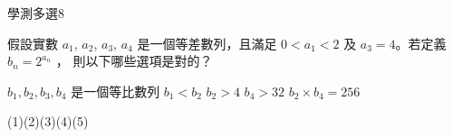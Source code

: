     \begin{QUESTION}
        \begin{ExamInfo}{95}{學測}{多選}{8}
        \end{ExamInfo}
        \begin{ExamAnsRateInfo}{38}{71}{33}{10}
        \end{ExamAnsRateInfo}
        \begin{QBODY}
            假設實數 $a_1$, $a_2$, $a_3$, $a_4$ 是一個等差數列，且滿足 $0<a_1 <2$ 及 $a_3 =4$。若定義 $b_n =2^{a_n}$ ， 則以下哪些選項是對的？
		\begin{QOPS} 
			\QOP $b_1 ,b_2 ,b_3 ,b_4$ 是一個等比數列 
			\QOP $b_1 <b_{2}$     
			\QOP $b_2 >4$ 
			\QOP $b_4 > 32$
			\QOP $b_2 \times b_4 =256$
		\end{QOPS}
        \end{QBODY}
        \begin{QFROMS}
        \end{QFROMS}
        \begin{QTAGS}\end{QTAGS}
        \begin{QANS}
            (1)(2)(3)(4)(5)
        \end{QANS}
        \begin{QSOLLIST}
        \end{QSOLLIST}
        \begin{QEMPTYSPACE}
        \end{QEMPTYSPACE}
    \end{QUESTION}
